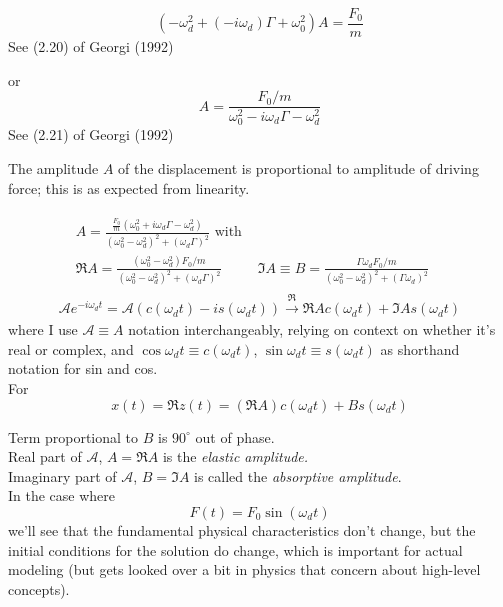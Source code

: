 \begin{equation}
	(-\omega_d^2 + (-i \omega_d)\Gamma + \omega_0^2)A = \frac{F_0}{m} 
\end{equation}
See (2.20) of Georgi (1992) \cite{agat:Geor1992}

or
\begin{equation}
	A = \frac{ F_0 / m }{ \omega_0^2 - i\omega_d \Gamma - \omega_d^2}
\end{equation}
See (2.21) of Georgi (1992) \cite{agat:Geor1992}

The amplitude $A$ of the displacement is proportional to amplitude of driving force; this is as expected from linearity.

\[
\begin{gathered}
	\begin{aligned}
		& A = \frac{ \frac{F_0}{m} (\omega_0^2 + i \omega_d \Gamma - \omega_d^2 )}{ (\omega_0^2 - \omega_d^2)^2 + (\omega_d \Gamma)^2 } \text{ with } & \\
		& \Re{A} = \frac{ (\omega_0^2 - \omega_d^2) F_0/m }{(\omega_0^2 - \omega_d^2)^2 + (\omega_d \Gamma)^2} & \Im{A} \equiv B = \frac{ \Gamma \omega_d F_0 /m }{ (\omega_0^2 - \omega_d^2)^2 + (\Gamma \omega_d )^2 }
			\end{aligned} \\
		\mathcal{A} e^{- i\omega_d t} = \mathcal{A} ( c(\omega_dt) - i s(\omega_dt)) \xrightarrow{\Re} \Re{A } c(\omega_d t) + \Im{A} s(\omega_d t)
\end{gathered}
\]
where I use $\mathcal{A} \equiv A$ notation interchangeably, relying on context on whether it's real or complex, and $\cos{\omega_d t} \equiv c(\omega_d t)$, $\sin{\omega_d t} \equiv s(\omega_d t)$ as shorthand notation for sin and cos. \\

For 
\[
x(t) = \Re{z(t)} = (\Re{A}) c(\omega_d t) + Bs(\omega_d t)
\]

Term proportional to $B$ is $90^{\circ}$ out of phase. \\
Real part of $\mathcal{A}$, $A = \Re{A}$ is the \emph{elastic amplitude.} \\
Imaginary part of $\mathcal{A}$, $B = \Im{A}$ is called the \emph{absorptive amplitude}. \\

In the case where 
\[
	F(t) = F_0 \sin{(\omega_dt)}
\]
we'll see that the fundamental physical characteristics don't change, but the initial conditions for the solution do change, which is important for actual modeling (but gets looked over a bit in physics that concern about high-level concepts).

